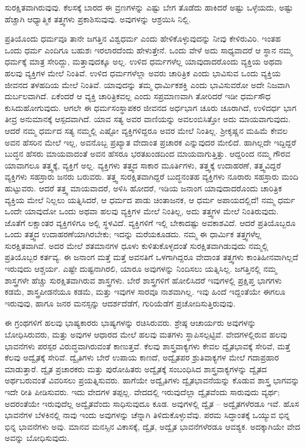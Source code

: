 ಸುರಕ್ಷಿತವಾಗಿರುವುವು. ಕೆಲಸಕ್ಕೆ ಬಾರದ ಈ ವ್ರಣಗಳನ್ನು ಎಷ್ಟು ಬೇಗ ತೊಡೆದು ಹಾಕಿದರೆ ಅಷ್ಟು ಒಳ್ಳೆಯದು, ಅಷ್ಟು ಹೆಚ್ಚಾಗಿ ಆಧ್ಯಾತ್ಮಿಕ ತತ್ತ್ವಗಳು ಪ್ರಕಾಶಿಸುವುವು. ಅವುಗಳನ್ನು ಆಶ್ರಯಿಸಿ ನಿಲ್ಲಿ.

ಪ್ರತಿಯೊಂದು ಧರ್ಮವೂ ತಾನೇ ಜಗತ್ತಿನ ವಿಶ್ವಧರ್ಮ ಎಂದು ಹೇಳಿಕೊಳ್ಳುವುದನ್ನು ನೀವು ಕೇಳಿರುವಿರಿ. ಇಂತಹ ಒಂದು ಧರ್ಮ ಎಂದಿಗೂ ಬಹುಶಃ ಇರಲಾರದೆಂದು ಹೇಳುತ್ತೇನೆ. ಒಂದು ವೇಳೆ ಅದು ಸಾಧ್ಯವಾದರೆ ಆ ಸ್ಥಾನ ನಮ್ಮ ಧರ್ಮಕ್ಕೆ ಮಾತ್ರ ಸೇರಿದ್ದು, ಮತ್ತಾವುದಕ್ಕೂ ಅಲ್ಲ. ಉಳಿದ ಧರ್ಮಗಳೆಲ್ಲ ಯಾವುದಾದರೊಂದು ವ್ಯಕ್ತಿಯ ಅಥವಾ ಹಲವು ವ್ಯಕ್ತಿಗಳ ಮೇಲೆ ನಿಂತಿವೆ. ಉಳಿದ ಧರ್ಮಗಳೆಲ್ಲಾ ಅವರು ಚಾರಿತ್ರಿಕ ಎಂದು ಭಾವಿಸುವ ಒಂದು ವ್ಯಕ್ತಿಯ ಜೀವನದ ತಳಹದಿಯ ಮೇಲೆ ನಿಂತಿವೆ. ಯಾವುದನ್ನು ತಮ್ಮ ಧಾರ್ಮಿಕಶಕ್ತಿ ಎಂದು ಭಾವಿಸುವರೋ ಅದೇ ನಿಜವಾಗಿ ದುರ್ಬಲವಾಗಿದೆ. ಏಕೆಂದರೆ ಆ ವ್ಯಕ್ತಿ ಚಾರಿತ್ರಿಕವಲ್ಲ ಎಂದು ಸಪ್ರಮಾಣವಾಗಿ ತೋರಿದರೆ ಇಡೀ ಧರ್ಮಸೌಧ ಕುಸಿದುಹೋಗುವುದು. ಆಗಲೇ ಈ ಧರ್ಮಸಂಸ್ಥಾಪಕರ ಜೀವನದ ಅರ್ಧಭಾಗ ಚೂರು ಚೂರಾಗಿದೆ, ಉಳಿದರ್ಧ ಭಾಗ ತೀವ್ರ ಅನುಮಾನಕ್ಕೆ ಆಸ್ಪದವಾಗಿದೆ. ಯಾವ ಸತ್ಯ ಅವರ ವಾಣಿಯನ್ನು ಅವಲಂಬಿಸಿತ್ತೋ ಅದು ಮಾಯವಾಗುವುದು. ಆದರೆ ನಮ್ಮ ಧರ್ಮದ ಸತ್ಯ ನಮ್ಮಲ್ಲಿ ಎಷ್ಟೋ ವ್ಯಕ್ತಿಗಳಿದ್ದರೂ ಅವರ ಮೇಲೆ ನಿಂತಿಲ್ಲ. ಶ‍್ರೀಕೃಷ್ಣನ ಮಹಿಮೆ ಕೇವಲ ಅವನ ಹೆಸರಿನ ಮೇಲೆ ಇಲ್ಲ, ಅವನೊಬ್ಬ ಪ್ರಖ್ಯಾತ ವೇದಾಂತ ಪ್ರಚಾರಕ ಎನ್ನುವುದರ ಮೇಲಿದೆ. ಹಾಗಿಲ್ಲದೇ ಇದ್ದಿದ್ದರೆ ಬುದ್ಧನ ಹೆಸರು ಮಾಯವಾದಂತೆ ಅವನ ಹೆಸರೂ ಭರತಖಂಡದಿಂದ ಮಾಯವಾಗುತ್ತಿತ್ತು. ಆದ್ದರಿಂದ ನಮ್ಮ ಗೌರವ ಯಾವಾಗಲೂ ತತ್ತ್ವಕ್ಕೆ, ವ್ಯಕ್ತಿಗೆ ಅಲ್ಲ. ವ್ಯಕ್ತಿಗಳು ತತ್ತ್ವದ ಸಾಕಾರ ಮೂರ್ತಿಗಳು, ತತ್ತ್ವಕ್ಕೆ ಉದಾಹರಣೆ, ತತ್ತ್ವವಿದ್ದರೆ ವ್ಯಕ್ತಿಗಳು ಸಹಸ್ರಾರು ಜನರು ಬರುವರು. ತತ್ತ್ವ ಸುರಕ್ಷಿತವಾಗಿದ್ದರೆ ಬುದ್ಧನಂತಹ ವ್ಯಕ್ತಿಗಳು ನೂರಾರು ಸಹಸ್ರಾರು ಮಂದಿ ಹುಟ್ಟುವರು. ಆದರೆ ತತ್ತ್ವ ಮಾಯವಾದರೆ, ಅಳಿಸಿ ಹೋದರೆ, ಇಡಿಯ ಜನಾಂಗ ಯಾವುದಾದರೊಂದು ಚಾರಿತ್ರಿಕ ವ್ಯಕ್ತಿಯ ಮೇಲೆ ನಿಲ್ಲಲು ಯತ್ನಿಸಿದರೆ, ಆ ಧರ್ಮದ ಪಾಡು ಚಿಂತಾಜನಕ, ಆ ಧರ್ಮ ಅಪಾಯದಲ್ಲಿದೆ! ನಮ್ಮ ಧರ್ಮ ಒಂದೇ ಯಾವುದೋ ಒಂದು ಅಥವಾ ಹಲವು ವ್ಯಕ್ತಿಗಳ ಮೇಲೆ ನಿಂತಿಲ್ಲ, ಅದು ತತ್ತ್ವಗಳ ಮೇಲೆ ನಿಂತಿರುವುದು. ಜೊತೆಗೆ ಲಕ್ಷಾಂತರ ವ್ಯಕ್ತಿಗಳಿಗೂ ಅಲ್ಲಿ ಸ್ಥಳವಿದೆ. ವ್ಯಕ್ತಿಗಳಿಗೆ ಇಲ್ಲಿ ಬೇಕಾದಷ್ಟು ಅವಕಾಶವಿದೆ. ಆದರೆ ಪ್ರತಿಯೊಬ್ಬರೂ ಒಂದು ತತ್ತ್ವದ ಉದಾಹರಣೆಯಾಗಿರಬೇಕು; ಇದನ್ನು ಮರೆಯಕೂಡದು. ನಮ್ಮ ಈ ಧಾರ್ಮಿಕ ತತ್ತ್ವಗಳೆಲ್ಲ ಸುರಕ್ಷಿತವಾಗಿವೆ. ಅದರ ಮೇಲೆ ಶತಮಾನಗಳ ಧೂಳು ಕುಳಿತುಕೊಳ್ಳದಂತೆ ಸುರಕ್ಷಿತವಾಗಿಡುವುದು ನಮ್ಮಲ್ಲಿ ಪ್ರತಿಯೊಬ್ಬರ ಕರ್ತವ್ಯ. ಈ ಜನಾಂಗ ಮತ್ತೆ ಮತ್ತೆ ಅವನತಿಗೆ ಒಳಗಾಗಿದ್ದರೂ ವೇದಾಂತ ತತ್ತ್ವಗಳು ಕಾಂತಿಹೀನವಾಗಿಲ್ಲದೆ ಇರುವುದು ಆಶ್ಚರ್ಯ. ಎಷ್ಟೇ ದುಷ್ಟನಾಗಿರಲಿ, ಯಾರೂ ಅವುಗಳನ್ನು ನಿಂದಿಸಲು ಯತ್ನಿಸಿಲ್ಲ. ಜಗತ್ತಿನಲ್ಲಿ ನಮ್ಮ ಶಾಸ್ತ್ರಗಳೇ ಹೆಚ್ಚು ಸುರಕ್ಷಿತವಾಗಿರುವ ಶಾಸ್ತ್ರಗಳು. ಬೇರೆ ಶಾಸ್ತ್ರಗಳಿಗೆ ಹೋಲಿಸಿದರೆ ಇವುಗಳಲ್ಲಿ ಪ್ರಕ್ಷಿಪ್ತ ಭಾಗಗಳು ಕಡಮೆ, ಶಾಸ್ತ್ರಪೀಡನೆಯೂ ಕಡಮೆ, ಮತ್ತು ಇವುಗಳ ಸಾರವೂ ನಾಶವಾಗಿಲ್ಲ. ಇವು ಹಿಂದೆ ಇದ್ದಂತೆಯೇ ಈಗಲೂ ಇರುವುವು, ಹಾಗೂ ಜನರ ಮನಸ್ಸನ್ನು ಆದರ್ಶದೆಡೆಗೆ, ಗುರಿಯೆಡೆಗೆ ಪ್ರಚೋದಿಸುತ್ತಿರುವುವು.

ಈ ಗ್ರಂಥಗಳಿಗೆ ಹಲವು ಭಾಷ್ಯಕಾರರು ಭಾಷ್ಯಗಳನ್ನು ರಚಿಸಿರುವರು. ಶ್ರೇಷ್ಠ ಆಚಾರ್ಯರು ಅವುಗಳನ್ನು ಬೋಧಿಸಿರುವರು, ಮತ್ತು ಅವುಗಳ ಆಧಾರದ ಮೇಲೆ ಹಲವು ಮತಗಳು ಸ್ಥಾಪಿಸಲ್ಪಟ್ಟಿವೆ. ವೇದಗಳಲ್ಲಿರುವ ಹಲವು ಭಾವನೆಗಳು ಪರಸ್ಪರ ವಿರುದ್ಧವಾಗಿರುವಂತೆ ಕಾಣುತ್ತವೆ. ಕೆಲವು ಶಾಸ್ತ್ರವಾಕ್ಯಗಳು ಕೇವಲ ದ್ವೈತಭಾವಕ್ಕೆ ಸೇರಿವೆ, ಮತ್ತೆ ಕೆಲವು ಅದ್ವೈತಕ್ಕೆ ಸೇರಿವೆ. ದ್ವೈತಿಗಳು ಬೇರೆ ಉಪಾಯ ಕಾಣದೆ, ಅದ್ವೈತಪರ ಶ್ರುತಿವಾಕ್ಯಗಳ ಮೇಲೆ ಗದಾಪ್ರಹಾರ ಮಾಡುತ್ತಾರೆ. ದ್ವೈತ ಪ್ರಚಾರಕರು ಮತ್ತು ಪುರೋಹಿತರು ಅದ್ವೈತಕ್ಕೆ ಸಂಬಂಧಿಸಿದ ಶಾಸ್ತ್ರವಾಕ್ಯಗಳನ್ನು ದ್ವೈತದ ಅರ್ಥಬರುವಂತೆ ವಿವರಿಸಲು ಪ್ರಯತ್ನಿಸುವರು. ಹಾಗೆಯೇ ಅದ್ವೈತಿಗಳು ದ್ವೈತಭಾವನೆಯನ್ನು ಕೊಡುವ ಶಾಸ್ತ್ರ ಭಾಗವನ್ನು ಇದೇ ರೀತಿ ಪೀಡಿಸುವರು. ಇದು ವೇದಗಳ ತಪ್ಪಲ್ಲ. ವೇದದಲ್ಲಿ ಇರುವುದೆಲ್ಲಾ ದ್ವೈತವೆಂದು ಸಾರುವುದು ವ್ಯರ್ಥ; ಅದರಂತೆಯೇ ಇರುವುದೆಲ್ಲ ಅದ್ವೈತವೆಂದು ಸಾಧಿಸುವುದೂ ಕೂಡ. ಅವುಗಳಲ್ಲಿ ದ್ವೈತ – ಅದ್ವೈತಗಳೆರಡೂ ಇವೆ. ಹೊಸ ಭಾವನೆಗಳ ಬೆಳಕಿನಲ್ಲಿ ನಾವು ಇಂದು ಅವುಗಳನ್ನು ಚೆನ್ನಾಗಿ ತಿಳಿದುಕೊಳ್ಳುವೆವು. ಪರಮ ಸಿದ್ಧಾಂತಕ್ಕೆ ಒಯ್ಯುವ ಭಿನ್ನ ಭಿನ್ನ ಭಾವನೆಗಳು ಅವು. ಮಾನವ ಮನಸ್ಸಿನ ವಿಕಾಸಕ್ಕೆ, ದ್ವೈತ, ಅದ್ವೈತ ಭಾವನೆಗಳೆರಡೂ ಆವಶ್ಯಕ. ಅದಕ್ಕಾಗಿಯೇ ವೇದ ಅವನ್ನು ಬೋಧಿಸುವುದು.

